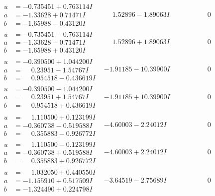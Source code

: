 \documentclass[1p]{elsarticle_modified}
\theoremstyle{definition}
\begin{document}
$$\begin{array}{c|c|c}
\begin{aligned}
u &= -0.735451 + 0.763114 I \\
a &= -1.33628 + 0.71471 I \\
b &= -1.65988 - 0.43120 I\end{aligned}
 & \phantom{-}1.52896 - 1.89063 I & \phantom{-0.000000 } 0 \\ \hline\begin{aligned}
u &= -0.735451 - 0.763114 I \\
a &= -1.33628 - 0.71471 I \\
b &= -1.65988 + 0.43120 I\end{aligned}
 & \phantom{-}1.52896 + 1.89063 I & \phantom{-0.000000 } 0 \\ \hline\begin{aligned}
u &= -0.390500 + 1.044200 I \\
a &= \phantom{-}0.23951 - 1.54767 I \\
b &= \phantom{-}0.954518 - 0.436619 I\end{aligned}
 & -1.91185 - 10.39900 I & \phantom{-0.000000 } 0 \\ \hline\begin{aligned}
u &= -0.390500 - 1.044200 I \\
a &= \phantom{-}0.23951 + 1.54767 I \\
b &= \phantom{-}0.954518 + 0.436619 I\end{aligned}
 & -1.91185 + 10.39900 I & \phantom{-0.000000 } 0 \\ \hline\begin{aligned}
u &= \phantom{-}1.110500 + 0.123199 I \\
a &= -0.360738 - 0.519588 I \\
b &= \phantom{-}0.355883 - 0.926772 I\end{aligned}
 & -4.60003 - 2.24012 I & \phantom{-0.000000 } 0 \\ \hline\begin{aligned}
u &= \phantom{-}1.110500 - 0.123199 I \\
a &= -0.360738 + 0.519588 I \\
b &= \phantom{-}0.355883 + 0.926772 I\end{aligned}
 & -4.60003 + 2.24012 I & \phantom{-0.000000 } 0 \\ \hline\begin{aligned}
u &= \phantom{-}1.032050 + 0.440550 I \\
a &= -1.155910 + 0.517509 I \\
b &= -1.324490 + 0.224798 I\end{aligned}
 & -3.64519 - 2.75689 I & \phantom{-0.000000 } 0 \\ \hline\begin{aligned}

\end{aligned}
\end{array}$$
\end{document}
